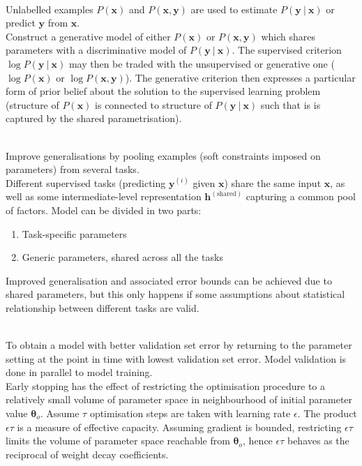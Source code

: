 \begin{remark} \\
Unlabelled examples $P(\bm{x})$ and $P(\bm{x}, \bm{y})$ are used to estimate $P(\bm{y} \ | \ \bm{x})$ or predict $\bm{y}$ from $\bm{x}$.\\
Construct a generative model of either $P(\bm{x})$ or $P(\bm{x}, \bm{y})$ which shares parameters with a discriminative model of $P(\bm{y} \ | \ \bm{x})$. The supervised criterion $\log P(\bm{y} \ | \ \bm{x})$ may then be traded with the unsupervised or generative one ($\log P(\bm{x})$ or $\log P(\bm{x}, \bm{y})$). The generative criterion then expresses a particular form of prior belief about the solution to the supervised learning problem (structure of $P(\bm{x})$ is connected to structure of $P(\bm{y} \ | \ \bm{x})$ such that is is captured by the shared parametrisation).
\end{remark}

\begin{remark} \\
Improve generalisations by pooling examples (soft constraints imposed on parameters) from several tasks.\\
Different supervised tasks (predicting $\bm{y}^{(i)}$ given $\bm{x}$) share the same input $\bm{x}$, as well as some intermediate-level representation $\bm{h}^{(\text{shared})}$ capturing a common pool of factors. Model can be divided in two parts:
\begin{enumerate}[label=\roman*.]
\setlength{\itemsep}{0pt}
\item Task-specific parameters
\item Generic parameters, shared across all the tasks
\end{enumerate}
Improved generalisation and associated error bounds can be achieved due to shared parameters, but this only happens if some assumptions about statistical relationship between different tasks are valid.
\end{remark}

\begin{remark} \\
To obtain a model with better validation set error by returning to the parameter setting at the point in time with lowest validation set error. Model validation is done in parallel to model training.\\
Early stopping has the effect of restricting the optimisation procedure to a relatively small volume of parameter space in neighbourhood of initial parameter value $\bm{\theta}_o$. Assume $\tau$ optimisation steps are taken with learning rate $\epsilon$. The product $\epsilon \tau$ is a measure of effective capacity. Assuming gradient is bounded, restricting $\epsilon \tau$ limits the volume of parameter space reachable from $\bm{\theta}_o$, hence $\epsilon \tau$ behaves as the reciprocal of weight decay coefficients.
\end{remark}

